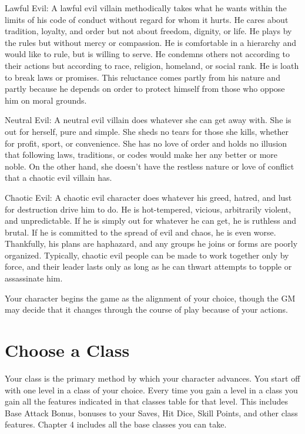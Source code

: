 \begin{itemize*}
	\item{Lawful Evil:}  A lawful evil villain methodically takes what he wants within the limits of his code of conduct without regard for whom it hurts. He cares about tradition, loyalty, and order but not about freedom, dignity, or life. He plays by the rules but without mercy or compassion. He is comfortable in a hierarchy and would like to rule, but is willing to serve. He condemns others not according to their actions but according to race, religion, homeland, or social rank. He is loath to break laws or promises. This reluctance comes partly from his nature and partly because he depends on order to protect himself from those who oppose him on moral grounds.
	\item{Neutral Evil:} A neutral evil villain does whatever she can get away with. She is out for herself, pure and simple. She sheds no tears for those she kills, whether for profit, sport, or convenience. She has no love of order and holds no illusion that following laws, traditions, or codes would make her any better or more noble. On the other hand, she doesn't have the restless nature or love of conflict that a chaotic evil villain has. 
	\item{Chaotic Evil:} A chaotic evil character does whatever his greed, hatred, and lust for destruction drive him to do. He is hot-tempered, vicious, arbitrarily violent, and unpredictable. If he is simply out for whatever he can get, he is ruthless and brutal. If he is committed to the spread of evil and chaos, he is even worse. Thankfully, his plans are haphazard, and any groups he joins or forms are poorly organized. Typically, chaotic evil people can be made to work together only by force, and their leader lasts only as long as he can thwart attempts to topple or assassinate him. 
\end{itemize*}
\vspace*{10pt}
Your character begins the game as the alignment of your choice, though the GM may decide that it changes through the course of play because of your actions.
 
\section{Choose a Class}

Your class is the primary method by which your character advances.  You start off with one level in a class of your choice.  Every time you gain a level in a class you gain all the features indicated in that classes table for that level.  This includes Base Attack Bonus, bonuses to your Saves, Hit Dice, Skill Points, and other class features.  Chapter 4 includes all the base classes you can take.

